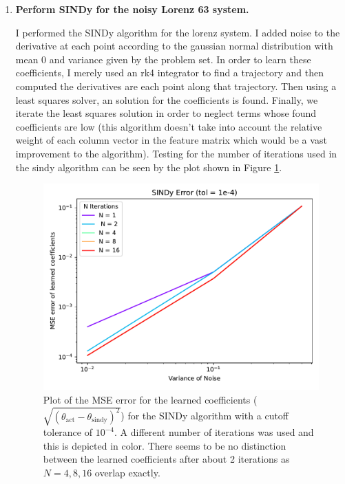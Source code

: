\documentclass{article}
\begin{document}
\begin{enumerate}
    \item \textbf{\Large Perform SINDy for the noisy Lorenz 63 system.}

    I performed the SINDy algorithm for the lorenz system. I added noise to the
    derivative at each point according to the gaussian normal distribution with
    mean 0 and variance given by the problem set. In order to learn these
    coefficients, I merely used an rk4 integrator to find a trajectory and then
    computed the derivatives are each point along that trajectory. Then using
    a least squares solver, an solution for the coefficients is found. Finally,
    we iterate the least squares solution in order to neglect terms whose found
    coefficients are low (this algorithm doesn't take into account the relative
    weight of each column vector in the feature matrix which would be a vast
    improvement to the algorithm). Testing for the number of iterations used in
    the sindy algorithm can be seen by the plot shown in Figure
    \ref{fig:noisy_sindy}. 

    \begin{figure}[ht]
        \centering
        \includegraphics[width=.8\textwidth]{noisy_coeff_err.pdf}
        \caption{Plot of the MSE error for the learned coefficients
        ($\sqrt{(\theta_{\text{act}} - \theta_{\text{sindy}})^2}$) for the SINDy
        algorithm with a cutoff tolerance of $10^{-4}$. A different
        number of iterations was used and this is depicted in color. There seems
        to be no distinction between the learned coefficients after about 2
        iterations as $N = 4, 8, 16$ overlap exactly.}
        \label{fig:noisy_sindy}
    \end{figure}


\end{enumerate}
\end{document}
